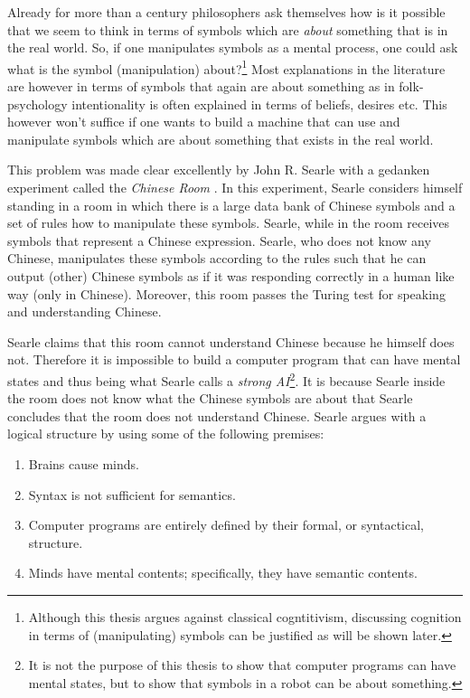 Already for more than a century philosophers ask themselves how is it possible that we seem to think in terms of symbols which are {\em about} something that is in the real world. So, if one manipulates symbols as a mental process, one could ask what is the symbol (manipulation) about?\footnote{Although this thesis argues against classical cogntitivism, discussing cognition in terms of (manipulating) symbols can be justified as will be shown later.} Most explanations in the literature are however in terms of symbols that again are about something as in folk-psychology intentionality is often explained in terms of beliefs, desires etc. This however won't suffice if one wants to build a machine that can use and manipulate symbols which are about something that exists in the real world.

\bigskip\noindent
{}
This problem was made clear excellently by John R. Searle with a gedanken experiment called the {\em Chinese Room} \cite{searle:1980}. In this experiment, Searle considers himself standing in a room in which there is a large data bank of Chinese symbols and a set of rules how to manipulate these symbols. Searle, while in the room receives symbols that represent a Chinese expression. Searle, who does not know any Chinese, manipulates these symbols according to the rules such that he can output (other) Chinese symbols as if it was responding correctly in a human like way (only in Chinese). Moreover, this room passes the Turing test for speaking and understanding Chinese.

Searle claims that this room cannot understand Chinese because he himself does not. Therefore it is impossible to build a computer program that can have mental states and thus being what Searle calls a {\em strong AI}\footnote{It is not the purpose of this thesis to show that computer programs can have mental states, but to show that symbols in a robot can be about something.}. It is because Searle inside the room does not know what the Chinese symbols are about that Searle concludes that the room does not understand Chinese. Searle argues with a logical structure by using some of the following premises\cite[p. 39]{searle:1984}:


\begin{enumerate}
\item Brains cause minds.
\item Syntax is not sufficient for semantics.
\item Computer programs are entirely defined by their formal, or syntactical, structure.
\item Minds have mental contents; specifically, they have semantic contents.
\end{enumerate}

